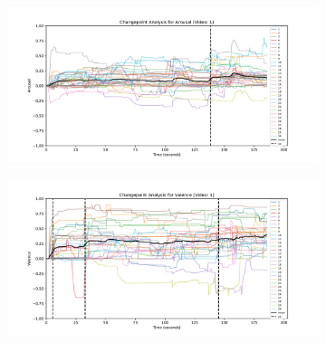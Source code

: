 \documentclass[11pt, letterpaper]{article}
\begin{document}
\begin{figure}
    \centering
    \begin{subfigure}[t]{0.49\textwidth}
        \centering
        \includegraphics[width=\linewidth]{changepoints_V1_arousal_avg_all_data} 
        \caption{} \label{fig:changepoints_V1_arousal_avg_all_data}
    \end{subfigure}
    \hfill
    \begin{subfigure}[t]{0.49\textwidth}
        \centering
        \includegraphics[width=\linewidth]{changepoints_V1_valence_avg_all_data} 
        \caption{} \label{fig:changepoints_V1_valence_avg_all_data}
    \end{subfigure}

    \vspace{1cm}
    

\end{figure}
\end{document}
